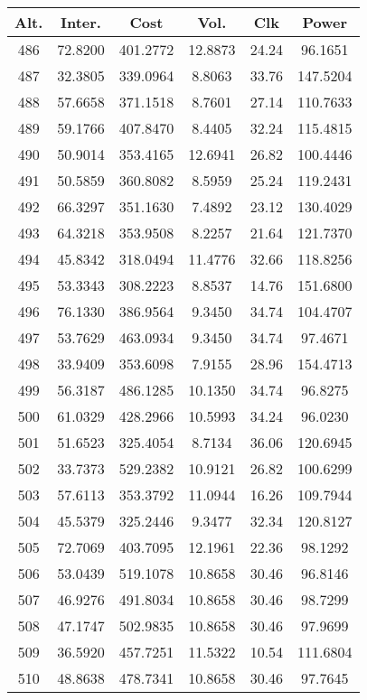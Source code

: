 \begin{center}
\begin{footnotesize}
\begin{tabular}{|c|ccccc|}
\hline
Alt. & Inter. & Cost & Vol. & Clk & Power\\
\hline
486 & 72.8200 & 401.2772 & 12.8873 & 24.24 & 96.1651 \\
487 & 32.3805 & 339.0964 & 8.8063 & 33.76 & 147.5204 \\
488 & 57.6658 & 371.1518 & 8.7601 & 27.14 & 110.7633 \\
489 & 59.1766 & 407.8470 & 8.4405 & 32.24 & 115.4815 \\
490 & 50.9014 & 353.4165 & 12.6941 & 26.82 & 100.4446 \\
491 & 50.5859 & 360.8082 & 8.5959 & 25.24 & 119.2431 \\
492 & 66.3297 & 351.1630 & 7.4892 & 23.12 & 130.4029 \\
493 & 64.3218 & 353.9508 & 8.2257 & 21.64 & 121.7370 \\
494 & 45.8342 & 318.0494 & 11.4776 & 32.66 & 118.8256 \\
495 & 53.3343 & 308.2223 & 8.8537 & 14.76 & 151.6800 \\
496 & 76.1330 & 386.9564 & 9.3450 & 34.74 & 104.4707 \\
497 & 53.7629 & 463.0934 & 9.3450 & 34.74 & 97.4671 \\
498 & 33.9409 & 353.6098 & 7.9155 & 28.96 & 154.4713 \\
499 & 56.3187 & 486.1285 & 10.1350 & 34.74 & 96.8275 \\
500 & 61.0329 & 428.2966 & 10.5993 & 34.24 & 96.0230 \\
501 & 51.6523 & 325.4054 & 8.7134 & 36.06 & 120.6945 \\
502 & 33.7373 & 529.2382 & 10.9121 & 26.82 & 100.6299 \\
503 & 57.6113 & 353.3792 & 11.0944 & 16.26 & 109.7944 \\
504 & 45.5379 & 325.2446 & 9.3477 & 32.34 & 120.8127 \\
505 & 72.7069 & 403.7095 & 12.1961 & 22.36 & 98.1292 \\
506 & 53.0439 & 519.1078 & 10.8658 & 30.46 & 96.8146 \\
507 & 46.9276 & 491.8034 & 10.8658 & 30.46 & 98.7299 \\
508 & 47.1747 & 502.9835 & 10.8658 & 30.46 & 97.9699 \\
509 & 36.5920 & 457.7251 & 11.5322 & 10.54 & 111.6804 \\
510 & 48.8638 & 478.7341 & 10.8658 & 30.46 & 97.7645 \\

\end{tabular}
\end{footnotesize}
\end{center}
